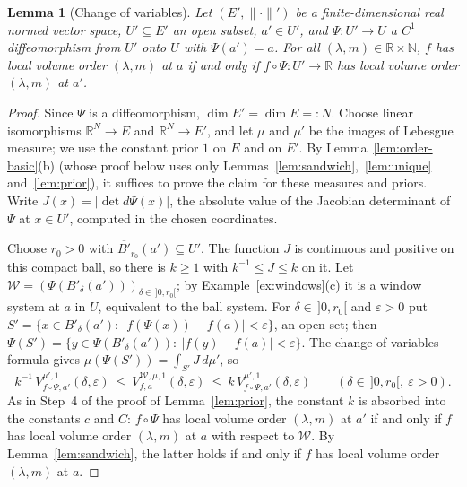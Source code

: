 \documentclass[11pt,a4paper]{article}
\newtheorem{lemma}[theorem]{Lemma}
\theoremstyle{definition}
\theoremstyle{remark}
\numberwithin{equation}{section}
\newcommand{\N}{\mathbb{N}}
\newcommand{\R}{\mathbb{R}}
\newcommand{\norm}[1]{\lVert #1\rVert}
\newcommand{\abs}[1]{\lvert #1\rvert}
\newcommand{\eps}{\varepsilon}
\begin{document}
\begin{lemma}[Change of variables]\label{lem:diffeo}
Let $(E',\norm\cdot')$ be a finite-dimensional real normed vector space, $U'\subseteq E'$ an open subset, $a'\in U'$, and $\Psi:U'\to U$ a $C^1$ diffeomorphism from $U'$ onto $U$ with $\Psi(a')=a$. For all $(\lambda,m)\in\R\times\N$, $f$ has local volume order $(\lambda,m)$ at $a$ if and only if $f\circ\Psi:U'\to\R$ has local volume order $(\lambda,m)$ at $a'$.
\end{lemma}
\begin{proof}
Since $\Psi$ is a diffeomorphism, $\dim E'=\dim E=:N$. Choose linear isomorphisms $\R^N\to E$ and $\R^N\to E'$, and let $\mu$ and $\mu'$ be the images of Lebesgue measure; we use the constant prior $1$ on $E$ and on $E'$. By Lemma~\ref{lem:order-basic}(b) (whose proof below uses only Lemmas~\ref{lem:sandwich},~\ref{lem:unique} and~\ref{lem:prior}), it suffices to prove the claim for these measures and priors. Write $J(x)=\abs{\det d\Psi(x)}$, the absolute value of the Jacobian determinant of $\Psi$ at $x\in U'$, computed in the chosen coordinates.

Choose $r_0>0$ with $\overline{B'}_{r_0}(a')\subseteq U'$. The function $J$ is continuous and positive on this compact ball, so there is $k\ge1$ with $k^{-1}\le J\le k$ on it. Let $\mathcal W=(\Psi(B'_\delta(a')))_{\delta\in\,]0,r_0[}$; by Example~\ref{ex:windows}(c) it is a window system at $a$ in $U$, equivalent to the ball system. For $\delta\in\,]0,r_0[$ and $\eps>0$ put $S'=\{x\in B'_\delta(a'):\ \abs{f(\Psi(x))-f(a)}<\eps\}$, an open set; then $\Psi(S')=\{y\in\Psi(B'_\delta(a')):\ \abs{f(y)-f(a)}<\eps\}$. The change of variables formula gives $\mu(\Psi(S'))=\int_{S'}J\,d\mu'$, so
\[
k^{-1}\,V^{\mu',1}_{f\circ\Psi,a'}(\delta,\eps)\ \le\ V^{\mathcal W,\mu,1}_{f,a}(\delta,\eps)\ \le\ k\,V^{\mu',1}_{f\circ\Psi,a'}(\delta,\eps)\qquad(\delta\in\,]0,r_0[,\ \eps>0).
\]
As in Step~4 of the proof of Lemma~\ref{lem:prior}, the constant $k$ is absorbed into the constants $c$ and $C$: $f\circ\Psi$ has local volume order $(\lambda,m)$ at $a'$ if and only if $f$ has local volume order $(\lambda,m)$ at $a$ with respect to $\mathcal W$. By Lemma~\ref{lem:sandwich}, the latter holds if and only if $f$ has local volume order $(\lambda,m)$ at $a$.
\end{proof}
\end{document}
